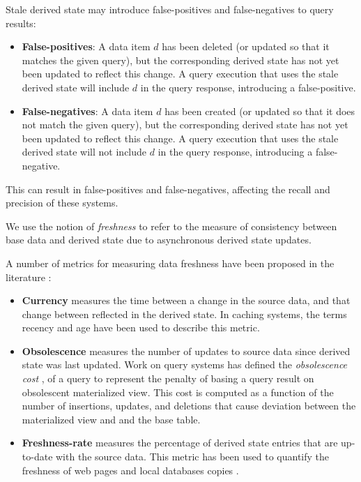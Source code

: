 Stale derived state may introduce false-positives and false-negatives to query results:
\begin{itemize}
  \item \textbf{False-positives}: A data item $d$ has been deleted (or updated so that it matches the given query),
  but the corresponding derived state has not yet been updated to reflect this change.
  A query execution that uses the stale derived state will include $d$ in the query response, introducing a false-positive.

  \item \textbf{False-negatives}: A data item $d$ has been created (or updated so that it does not match the given query),
  but the corresponding derived state has not yet been updated to reflect this change.
  A query execution that uses the stale derived state will not include $d$ in the query response,
  introducing a false-negative.
\end{itemize}
This can result in false-positives and false-negatives, affecting the recall and precision of these systems.

We use the notion of \textit{freshness} to refer to the measure of consistency between base data and derived state due to
asynchronous derived state updates.

A number of metrics for measuring data freshness have been proposed in the literature \cite{bouzeghoub:datafreshness}:
\begin{itemize}
  \item \textbf{Currency} measures the time between a change in the source data, and that change between reflected in
  the derived state.
  In caching systems, the terms recency \cite{bright:latencyrecency} and age \cite{cho:dbfreshness}
  have been used to describe this metric.
  \item \textbf{Obsolescence} measures the number of updates to source data since derived state was last updated.
  Work on query systems has defined the \textit{obsolescence cost} \cite{avigdor:obsolescent}, of a query to represent
  the penalty of basing a query result on obsolescent materialized view.
  This cost is computed as a function of the number of insertions, updates, and deletions that cause deviation between
  the materialized view and and the base table.
  \item \textbf{Freshness-rate} measures the percentage of derived state entries that are up-to-date with the source
  data.
  This metric has been used to quantify the freshness of web pages \cite{labrinidis:balancingperfomancefreshness} and
  local databases copies \cite{cho:dbfreshness}.
\end{itemize}

